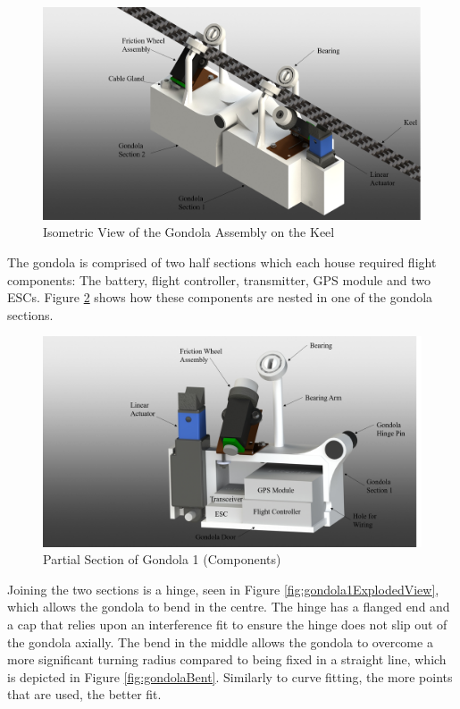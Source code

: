 \documentclass[../main.tex]{subfiles}
\begin{document}
\begin{figure}[H]
	\centering
	\includegraphics[width=.8\linewidth]{img/design/gondola/gondolaIsometric.png}
	\caption{Isometric View of the Gondola Assembly on the Keel}
	\label{fig:gondolaIsomeric}
\end{figure}

The gondola is comprised of two half sections which each house required flight components: The battery, flight controller, transmitter, GPS module and two ESCs. Figure \ref{fig:gondolaPartialSection} shows how these components are nested in one of the gondola sections. 

\begin{figure}[H]
	\centering
	\includegraphics[width=.8\linewidth]{img/design/gondola/gondolaPartialSection.png}
	\caption{Partial Section of Gondola 1 (Components)}
	\label{fig:gondolaPartialSection}
\end{figure}

Joining the two sections is a hinge, seen in Figure  \ref{fig:gondola1ExplodedView}, which allows the gondola to bend in the centre. The hinge has a flanged end and a cap that relies upon an interference fit to ensure the hinge does not slip out of the gondola axially. The bend in the middle allows the gondola to overcome a more significant turning radius compared to being fixed in a straight line, which is depicted in Figure \ref{fig:gondolaBent}. Similarly to curve fitting, the more points that are used, the better fit. 
\end{document}
